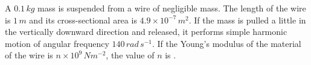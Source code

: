 
\item A \(0.1\,kg\) mass is suspended from a wire of negligible mass. The length of the wire is \(1\,m\) and its cross-sectional area is \(4.9\times10^{-7}\,m^2\). If the mass is pulled a little in the vertically downward direction and released, it performs simple harmonic motion of angular frequency \(140\,rad\,s^{-1}\). If the Young's modulus of the material of the wire is \(n\times10^9\,Nm^{-2}\), the value of \(n\) is \underline{\hspace{2.5cm}}.
